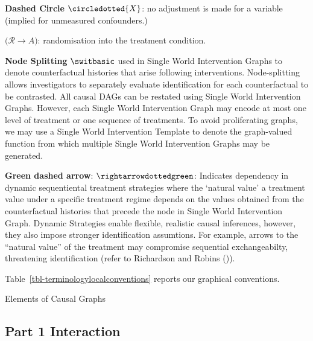 \documentclass[
  single column]{article}
\begin{document}
\textbf{Dashed Circle} \(\circledotted{X}\): no adjustment is made for a
variable (implied for unmeasured confounders.)

\textbf{\(\big(\mathcal{R} \rightarrow A\big)\)}: randomisation into the
treatment condition.

\textbf{Node Splitting} \(\switbasic\) used in Single World Intervention
Graphs to denote counterfactual histories that arise following
interventions. Node-splitting allows investigators to separately
evaluate identification for each counterfactual to be contrasted. All
causal DAGs can be restated using Single World Intervention Graphs.
However, each Single World Intervention Graph may encode at most one
level of treatment or one sequence of treatments. To avoid proliferating
graphs, we may use a Single World Intervention Template to denote the
graph-valued function from which multiple Single World Intervention
Graphs may be generated.

\textbf{Green dashed arrow}: \(\rightarrowdottedgreen\): Indicates
dependency in dynamic sequentiental treatment strategies where the
`natural value' a treatment value under a specific treatment regime
depends on the values obtained from the counterfactual histories that
precede the node in Single World Intervention Graph. Dynamic Strategies
enable flexible, realistic causal inferences, however, they also impose
stronger identification assumtions. For example, arrows to the ``natural
value'' of the treatment may compromise sequential exchangeabilty,
threatening identification (refer to Richardson and Robins
()).

Table~\ref{tbl-terminologylocalconventions} reports our graphical
conventions.

\newpage{}

\begin{table}

\caption{\label{tbl-terminologygeneral}Elements of Causal Graphs}

\centering{

\terminologygeneral

}

\end{table}%

\newpage{}

\subsection{Part 1 Interaction}\label{part-1-interaction}
\end{document}
